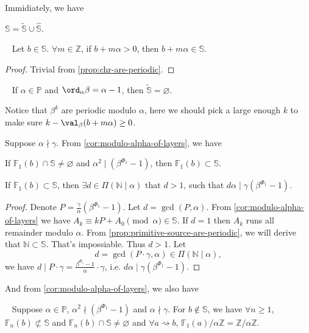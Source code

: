 Immidiately, we have
\begin{proposition}
    $\mathbb{S} = \tilde{\mathbb{S}} \cup \hat{\mathbb{S}}$.
\end{proposition}
\begin{proposition}~\label{prop:primitive-source-are-periodic}
    Let $b \in \mathbb{S}$. $\forall m \in \mathbb{Z}$, if $b + m\alpha > 0$, then $b + m\alpha \in \mathbb{S}$.
\end{proposition}
\begin{proof}
    Trivial from \cref{prop:chr-are-periodic}.
\end{proof}
\begin{proposition}~\label{prop:primitive-source-of-prime-alpha}
    If $\alpha \in \mathbb{P}$ and $\ord_{\alpha}\beta = \alpha - 1$, then $\tilde{\mathbb{S}} = \varnothing$.
\end{proposition}
\begin{remark}
    Notice that $\beta^{k}$ are periodic modulo $\alpha$, here we should pick a large enough $k$ to make sure $k - \val_{\beta}(b + m\alpha) \ge 0$.
\end{remark}
Suppose $\alpha \nmid \gamma$. From \cref{cor:modulo-alpha-of-layers}, we have
\begin{proposition}
    If $\mathbb{F}_{1}(b) \cap \mathbb{S} \ne \varnothing$ and $\alpha^{2}\mid (\beta^{\Phi_1} - 1)$, then $\mathbb{F}_{1}(b) \subset \mathbb{S}$.
\end{proposition}
\begin{proposition}
    If $\mathbb{F}_{1}(b) \subset \mathbb{S}$, then $\exists d \in \Pi(\mathbb{N}\mid\alpha)$ that $d > 1$, such that $d\alpha\mid \gamma (\beta^{\Phi_1} - 1)$.
\end{proposition}
\begin{proof}
    Denote $P = \frac{\gamma}{\alpha}(\beta^{\Phi_1} - 1)$. Let $d = \gcd(P, \alpha)$.
    From \cref{cor:modulo-alpha-of-layers} we have $A_k \equiv kP + A_0 \pmod{\alpha} \in \mathbb{S}$. If $d = 1$ then $A_k$ runs all remainder modulo $\alpha$. From \cref{prop:primitive-source-are-periodic}, we will derive that $\mathbb{N}\subset\mathbb{S}$. That's impossiable. Thus $d > 1$. Let
    \[ d = \gcd(P\cdot\gamma, \alpha) \in \Pi(\mathbb{N}\mid\alpha), \]
    we have $d \mid P\cdot\gamma = \frac{\beta^{\Phi_1} - 1}{\alpha}\cdot \gamma$, i.e. $d\alpha\mid \gamma (\beta^{\Phi_1} - 1)$.
\end{proof}
And from \cref{cor:modulo-alpha-of-layers}, we also have
\begin{proposition}~\label{prop:source-set-dijoint-primitive-source}
    Suppose $\alpha\in\mathbb{P}$, $\alpha^{2}\nmid (\beta^{\Phi_1} - 1)$ and $\alpha\nmid\gamma$.
    For $b\not\in\mathbb{S}$, we have $\forall n\ge 1$, $\mathbb{F}_{n}(b) \not\subset \mathbb{S}$ and $\mathbb{F}_{n}(b) \cap \mathbb{S} \ne \varnothing$ and $\forall a \rightsquigarrow b$, $\mathbb{F}_{1}(a)/\alpha\mathbb{Z} = \mathbb{Z}/\alpha\mathbb{Z}$.
\end{proposition}
